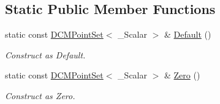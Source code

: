 \subsection*{Static Public Member Functions}
\begin{DoxyCompactItemize}
\item 
static const \hyperlink{classow__core_1_1DCMPointSet}{D\+C\+M\+Point\+Set}$<$ \+\_\+\+Scalar $>$ \& \hyperlink{classow__core_1_1DCMPointSet_abe042870f50eef779d4109949a9650ac}{Default} ()\hypertarget{classow__core_1_1DCMPointSet_abe042870f50eef779d4109949a9650ac}{}\label{classow__core_1_1DCMPointSet_abe042870f50eef779d4109949a9650ac}

\begin{DoxyCompactList}\small\item\em Construct as Default. \end{DoxyCompactList}\item 
static const \hyperlink{classow__core_1_1DCMPointSet}{D\+C\+M\+Point\+Set}$<$ \+\_\+\+Scalar $>$ \& \hyperlink{classow__core_1_1DCMPointSet_a3580b7a270ab3a49aed1f548795e203a}{Zero} ()\hypertarget{classow__core_1_1DCMPointSet_a3580b7a270ab3a49aed1f548795e203a}{}\label{classow__core_1_1DCMPointSet_a3580b7a270ab3a49aed1f548795e203a}

\begin{DoxyCompactList}\small\item\em Construct as Zero. \end{DoxyCompactList}\end{DoxyCompactItemize}
